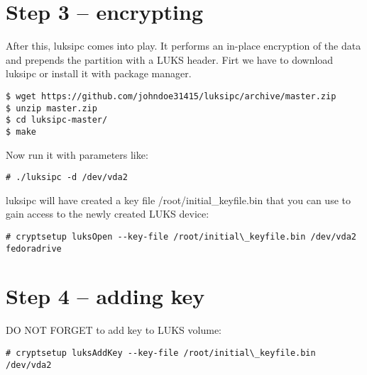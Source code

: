 \section{Step 3 -- encrypting}
After this, luksipc comes into play. It performs an in-place encryption of the data and prepends the partition with a LUKS header. Firt we have to download luksipc or install it with package manager.
\begin{lstlisting}[columns=fixed,basicstyle=\ttfamily\footnotesize,tabsize=4,backgroundcolor=\color{yellow!10}]
$ wget https://github.com/johndoe31415/luksipc/archive/master.zip
$ unzip master.zip
$ cd luksipc-master/
$ make
\end{lstlisting}
Now run it with parameters like:
\begin{lstlisting}[columns=fixed,basicstyle=\ttfamily\footnotesize,tabsize=4,backgroundcolor=\color{yellow!10}]
# ./luksipc -d /dev/vda2
\end{lstlisting}
luksipc will have created a key file /root/initial\_keyfile.bin that you can use to gain access to the newly created LUKS device:
\begin{lstlisting}[columns=fixed,basicstyle=\ttfamily\footnotesize,tabsize=4,backgroundcolor=\color{yellow!10}]
# cryptsetup luksOpen --key-file /root/initial\_keyfile.bin /dev/vda2 fedoradrive
\end{lstlisting}



\section{Step 4 -- adding key}
DO NOT FORGET to add key to LUKS volume:
\begin{lstlisting}[columns=fixed,basicstyle=\ttfamily\footnotesize,tabsize=4,backgroundcolor=\color{yellow!10}]
# cryptsetup luksAddKey --key-file /root/initial\_keyfile.bin /dev/vda2
\end{lstlisting}
